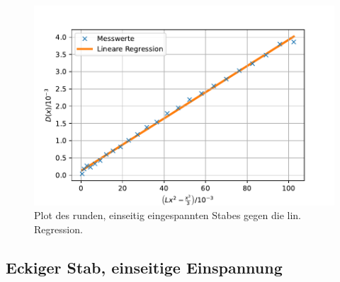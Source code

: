 \begin{figure}[H]
  \centering
  \includegraphics{pictures/Lineare Regression1.pdf}
  \caption{Plot des runden, einseitig eingespannten Stabes gegen die lin. Regression.}
  \label{fig:plot1}
\end{figure}

\subsection{Eckiger Stab, einseitige Einspannung}




